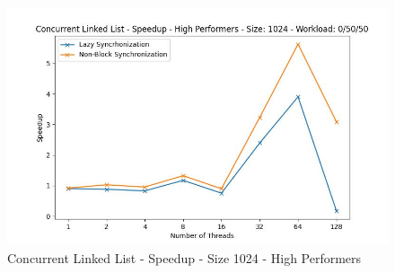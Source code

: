 \documentclass[../final_report.tex]{subfiles}
\begin{document}
\begin{figure}[H]
        \includegraphics[scale=0.4]{outFiles/plots/concurrent_data_structs_high_speedup_1024_0_50_50.jpg}
    \caption{Concurrent Linked List - Speedup - Size 1024 - High Performers}
    \label{fig:Concurrent Linked List - Speedup - Size 1024 - High Performers}
\end{figure}
\end{document}

